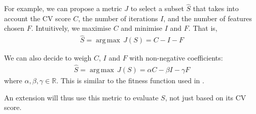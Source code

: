 \documentclass[12pt, twoside, a4paper]{report}
\DeclareMathOperator*{\argmax}{arg\,max}
\begin{document}
For example, we can propose a metric $J$ to select a subset $\widehat{S}$ that takes into account the CV score $C$, the number of iterations $I$, and the number of features chosen $F$. Intuitively, we maximise $C$ and minimise $I$ and $F$. That is,
\begin{align*}
\widehat{S} = \argmax \, J(S) = C - I - F
\end{align*}

We can also decide to weigh $C$, $I$ and $F$ with non-negative coefficients:
\begin{align*}
\widehat{S} = \argmax \, J(S) = \alpha C - \beta I - \gamma F
\end{align*}
where $\alpha, \beta, \gamma \in \mathbb{R}$. This is similar to the fitness function used in \cite{RefWorks:199}.

An extension will thus use this metric to evaluate $S$, not just based on its CV score.

\newpage

\singlespacing
{}



\end{document}
